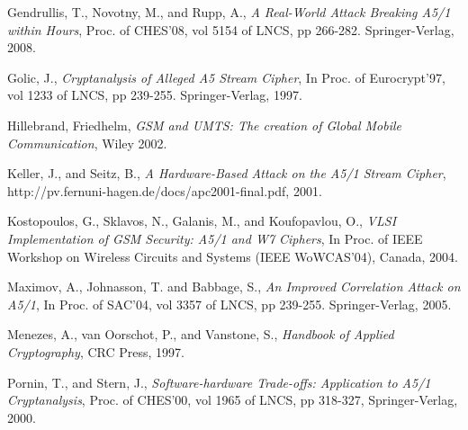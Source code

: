 \documentclass{llncs}
\begin{document}
\begin{thebibliography}{Ref}
\bibitem{[Rupp]} {Gendrullis, T., Novotny, M., and Rupp, A.}, {\it A Real-World Attack Breaking A5/1 within Hours}, Proc. of CHES'08, vol 5154 of LNCS, pp 266-282. Springer-Verlag, 2008.

\bibitem{[Golic]} {Golic, J.}, {\it Cryptanalysis of Alleged A5 Stream Cipher}, In Proc. of Eurocrypt'97, vol 1233 of LNCS, pp 239-255. Springer-Verlag, 1997.

\bibitem{[Hill]} {Hillebrand, Friedhelm}, {\it GSM and UMTS: The creation of Global Mobile Communication}, Wiley 2002.

\bibitem{[KS01]} {Keller, J., and Seitz, B.}, {\it A Hardware-Based Attack on the A5/1 Stream Cipher}, http://pv.fernuni-hagen.de/docs/apc2001-final.pdf, 2001.

\bibitem{[period]} {Kostopoulos, G., Sklavos, N., Galanis, M., and Koufopavlou, O.}, {\it VLSI Implementation of GSM Security: A5/1 and W7 Ciphers}, In Proc. of IEEE Workshop on Wireless Circuits and Systems (IEEE WoWCAS'04), Canada, 2004.

\bibitem{[Max]} {Maximov, A., Johnasson, T. and Babbage, S.}, {\it An Improved Correlation Attack on A5/1}, In Proc. of SAC'04, vol 3357 of LNCS, pp 239-255. Springer-Verlag, 2005.

\bibitem{[Men]} {Menezes, A., van Oorschot, P., and Vanstone, S.}, {\it Handbook of Applied Cryptography}, CRC Press, 1997.

\bibitem{[Porn]} {Pornin, T., and Stern, J.}, {\it Software-hardware Trade-offs: Application to A5/1 Cryptanalysis}, Proc. of CHES'00, vol 1965 of LNCS, pp 318-327, Springer-Verlag, 2000.
\end{thebibliography}
\end{document}
